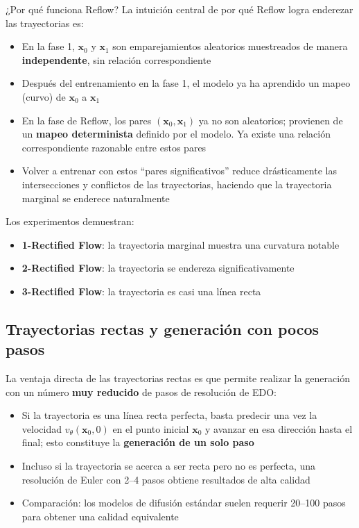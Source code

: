 \documentclass[a4paper]{article}
\begin{document}
\begin{importantbox}{¿Por qué funciona Reflow?}
La intuición central de por qué Reflow logra enderezar las trayectorias es:
\begin{itemize}
    \item En la fase 1, $\mathbf{x}_0$ y $\mathbf{x}_1$ son emparejamientos aleatorios muestreados de manera \textbf{independente}, sin relación correspondiente
    \item Después del entrenamiento en la fase 1, el modelo ya ha aprendido un mapeo (curvo) de $\mathbf{x}_0$ a $\mathbf{x}_1$
    \item En la fase de Reflow, los pares $(\mathbf{x}_0, \mathbf{x}_1)$ ya no son aleatorios; provienen de un \textbf{mapeo determinista} definido por el modelo. Ya existe una relación correspondiente razonable entre estos pares
    \item Volver a entrenar con estos ``pares significativos'' reduce drásticamente las intersecciones y conflictos de las trayectorias, haciendo que la trayectoria marginal se enderece naturalmente
\end{itemize}
\end{importantbox}

Los experimentos demuestran:
\begin{itemize}
    \item \textbf{1-Rectified Flow}: la trayectoria marginal muestra una curvatura notable
    \item \textbf{2-Rectified Flow}: la trayectoria se endereza significativamente
    \item \textbf{3-Rectified Flow}: la trayectoria es casi una línea recta
\end{itemize}

\subsection{Trayectorias rectas y generación con pocos pasos}

La ventaja directa de las trayectorias rectas es que permite realizar la generación con un número \textbf{muy reducido} de pasos de resolución de EDO:

\begin{itemize}
    \item Si la trayectoria es una línea recta perfecta, basta predecir una vez la velocidad $v_\theta(\mathbf{x}_0, 0)$ en el punto inicial $\mathbf{x}_0$ y avanzar en esa dirección hasta el final; esto constituye la \textbf{generación de un solo paso}
    \item Incluso si la trayectoria se acerca a ser recta pero no es perfecta, una resolución de Euler con 2--4 pasos obtiene resultados de alta calidad
    \item Comparación: los modelos de difusión estándar suelen requerir 20--100 pasos para obtener una calidad equivalente
\end{itemize}
\end{document}
